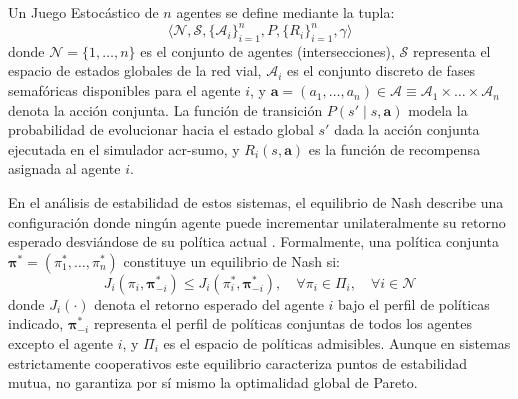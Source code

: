 Un Juego Estocástico de $n$ agentes se define mediante la tupla:
\begin{equation}
    \langle \mathcal{N}, \mathcal{S}, \{ \mathcal{A}_i \}_{i=1}^n, P, \{ R_i \}_{i=1}^n, \gamma \rangle
    \label{eq:juego_estocastico}
\end{equation}
donde $\mathcal{N} = \{1, \dots, n\}$ es el conjunto de agentes (intersecciones), $\mathcal{S}$ representa el espacio de estados globales de la red vial, $\mathcal{A}_i$ es el conjunto discreto de fases semafóricas disponibles para el agente $i$, y $\mathbf{a} = (a_1, \dots, a_n) \in \boldsymbol{\mathcal{A}} \equiv \mathcal{A}_1 \times \dots \times \mathcal{A}_n$ denota la acción conjunta. La función de transición $P(s' \mid s, \mathbf{a})$ modela la probabilidad de evolucionar hacia el estado global $s'$ dada la acción conjunta ejecutada en el simulador \acrshort{acr-sumo}, y $R_i(s, \mathbf{a})$ es la función de recompensa asignada al agente $i$.

En el análisis de estabilidad de estos sistemas, el equilibrio de Nash describe una configuración donde ningún agente puede incrementar unilateralmente su retorno esperado desviándose de su política actual \cite{marlbook}. Formalmente, una política conjunta $\boldsymbol{\pi}^* = (\pi_1^*, \dots, \pi_n^*)$ constituye un equilibrio de Nash si:
\begin{equation}
    J_i(\pi_i, \boldsymbol{\pi}_{-i}^*) \le J_i(\pi_i^*, \boldsymbol{\pi}_{-i}^*), \quad \forall \pi_i \in \Pi_i, \quad \forall i \in \mathcal{N}
    \label{eq:equilibrio_nash}
\end{equation}
donde $J_i(\cdot)$ denota el retorno esperado del agente $i$ bajo el perfil de políticas indicado, $\boldsymbol{\pi}_{-i}^*$ representa el perfil de políticas conjuntas de todos los agentes excepto el agente $i$, y $\Pi_i$ es el espacio de políticas admisibles. Aunque en sistemas estrictamente cooperativos este equilibrio caracteriza puntos de estabilidad mutua, no garantiza por sí mismo la optimalidad global de Pareto.

